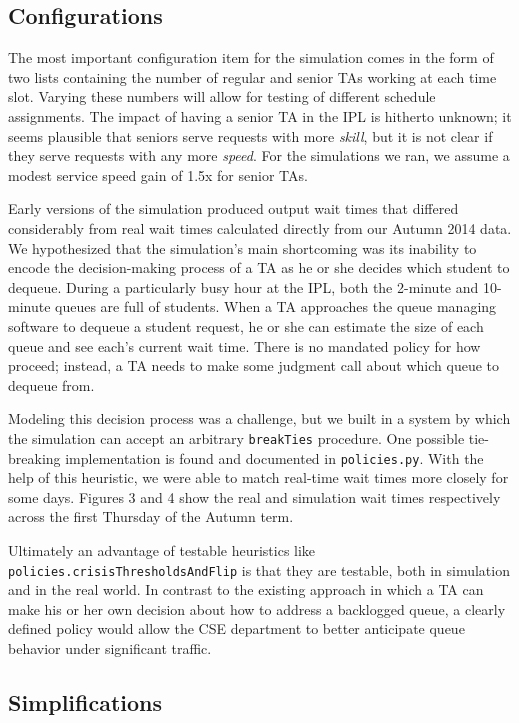 \documentclass{article}
\begin{document}
\begin{multicols}{2}
\subsection*{Configurations}

The most important configuration item for the simulation comes in the form of two lists containing the number of regular and senior TAs working at each time slot. Varying these numbers will allow for testing of different schedule assignments. The impact of having a senior TA in the IPL is hitherto unknown; it seems plausible that seniors serve requests with more \textit{skill}, but it is not clear if they serve requests with any more \textit{speed}. For the simulations we ran, we assume a modest service speed gain of 1.5x for senior TAs.

Early versions of the simulation produced output wait times that differed considerably from real wait times calculated directly from our Autumn 2014 data. We hypothesized that the simulation's main shortcoming was its inability to encode the decision-making process of a TA as he or she decides which student to dequeue. During a particularly busy hour at the IPL, both the 2-minute and 10-minute queues are full of students. When a TA approaches the queue managing software to dequeue a student request, he or she can estimate the size of each queue and see each's current wait time. There is no mandated policy for how proceed; instead, a TA needs to make some judgment call about which queue to dequeue from.

Modeling this decision process was a challenge, but we built in a system by which the simulation can accept an arbitrary \texttt{breakTies} procedure. One possible tie-breaking implementation is found and documented in \texttt{policies.py}. With the help of this heuristic, we were able to match real-time wait times more closely for some days. Figures 3 and 4 show the real and simulation wait times respectively across the first Thursday of the Autumn term.

Ultimately an advantage of testable heuristics like \texttt{policies.crisisThresholdsAndFlip} is that they are testable, both in simulation and in the real world. In contrast to the existing approach in which a TA can make his or her own decision about how to address a backlogged queue, a clearly defined policy would allow the CSE department to better anticipate queue behavior under significant traffic.

\subsection*{Simplifications}


\end{multicols}
\end{document}
